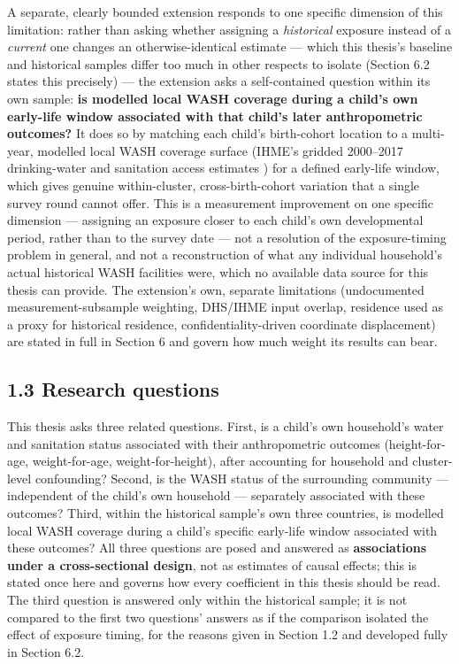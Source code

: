 A separate, clearly bounded extension responds to one specific dimension of this limitation: rather than asking whether assigning a \textit{historical} exposure instead of a \textit{current} one changes an otherwise-identical estimate --- which this thesis's baseline and historical samples differ too much in other respects to isolate (Section 6.2 states this precisely) --- the extension asks a self-contained question within its own sample: \textbf{is modelled local WASH coverage during a child's own early-life window associated with that child's later anthropometric outcomes?} It does so by matching each child's birth-cohort location to a multi-year, modelled local WASH coverage surface (IHME's gridded 2000--2017 drinking-water and sanitation access estimates \parencite{LBDWaSH2020}) for a defined early-life window, which gives genuine within-cluster, cross-birth-cohort variation that a single survey round cannot offer. This is a measurement improvement on one specific dimension --- assigning an exposure closer to each child's own developmental period, rather than to the survey date --- not a resolution of the exposure-timing problem in general, and not a reconstruction of what any individual household's actual historical WASH facilities were, which no available data source for this thesis can provide. The extension's own, separate limitations (undocumented measurement-subsample weighting, DHS/IHME input overlap, residence used as a proxy for historical residence, confidentiality-driven coordinate displacement) are stated in full in Section 6 and govern how much weight its results can bear.

\subsection*{1.3 Research questions}

This thesis asks three related questions. First, is a child's own household's water and sanitation status associated with their anthropometric outcomes (height-for-age, weight-for-age, weight-for-height), after accounting for household and cluster-level confounding? Second, is the WASH status of the surrounding community --- independent of the child's own household --- separately associated with these outcomes? Third, within the historical sample's own three countries, is modelled local WASH coverage during a child's specific early-life window associated with these outcomes? All three questions are posed and answered as \textbf{associations under a cross-sectional design}, not as estimates of causal effects; this is stated once here and governs how every coefficient in this thesis should be read. The third question is answered only within the historical sample; it is not compared to the first two questions' answers as if the comparison isolated the effect of exposure timing, for the reasons given in Section 1.2 and developed fully in Section 6.2.

